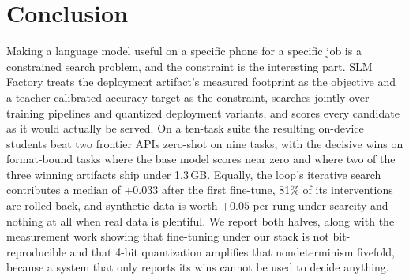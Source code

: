 \documentclass[sigconf,10pt]{acmart}
\newcommand{\TODO}[1]{\textcolor{red}{\textbf{[TODO: #1]}}}
\begin{document}
\section{Conclusion}

Making a language model useful on a specific phone for a specific job is a constrained search
problem, and the constraint is the interesting part. SLM Factory treats the deployment
artifact's measured footprint as the objective and a teacher-calibrated accuracy target as the
constraint, searches jointly over training pipelines and quantized deployment variants, and
scores every candidate as it would actually be served. On a ten-task suite the resulting
on-device students beat two frontier APIs zero-shot on nine tasks, with the decisive wins on
format-bound tasks where the base model scores near zero and where two of the three winning
artifacts ship under 1.3\,GB. Equally, the loop's iterative search contributes a median of
$+0.033$ after the first fine-tune, 81\% of its interventions are rolled back, and synthetic data is
worth $+0.05$ per rung under scarcity and nothing at all when real data is plentiful. We
report both halves, along with the measurement work showing that fine-tuning under our stack
is not bit-reproducible and that 4-bit quantization amplifies that nondeterminism fivefold,
because a system that only reports its wins cannot be used to decide anything.

\end{document}

